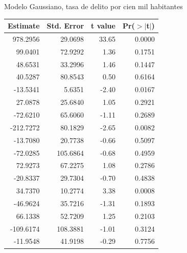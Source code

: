 \documentclass[ignorenonframetext,]{beamer}
\begin{document}
\begin{frame}{Modelo Gaussiano, tasa de delito por cien mil habitantes}

\begin{table}[ht]
\centering
{\small
\begin{tabular}{rrrr}
  \hline
Estimate & Std. Error & t value & Pr($>$$|$t$|$) \\ 
  \hline
978.2956 & 29.0698 & 33.65 & 0.0000 \\ 
  99.0401 & 72.9292 & 1.36 & 0.1751 \\ 
  48.6531 & 33.2996 & 1.46 & 0.1447 \\ 
  40.5287 & 80.8543 & 0.50 & 0.6164 \\ 
  -13.5341 & 5.6351 & -2.40 & 0.0167 \\ 
  27.0878 & 25.6840 & 1.05 & 0.2921 \\ 
  -72.6210 & 65.6060 & -1.11 & 0.2689 \\ 
  -212.7272 & 80.1829 & -2.65 & 0.0082 \\ 
  -13.7080 & 20.7738 & -0.66 & 0.5097 \\ 
  -72.0285 & 105.6864 & -0.68 & 0.4959 \\ 
  72.9273 & 67.2275 & 1.08 & 0.2786 \\ 
  -20.8337 & 29.7304 & -0.70 & 0.4838 \\ 
  34.7370 & 10.2774 & 3.38 & 0.0008 \\ 
  -46.9624 & 35.7216 & -1.31 & 0.1893 \\ 
  66.1338 & 52.7209 & 1.25 & 0.2103 \\ 
  -109.6174 & 108.3881 & -1.01 & 0.3124 \\ 
  -11.9548 & 41.9198 & -0.29 & 0.7756 \\ 
   \hline
\end{tabular}
}
\end{table}

\end{frame}
\end{document}
